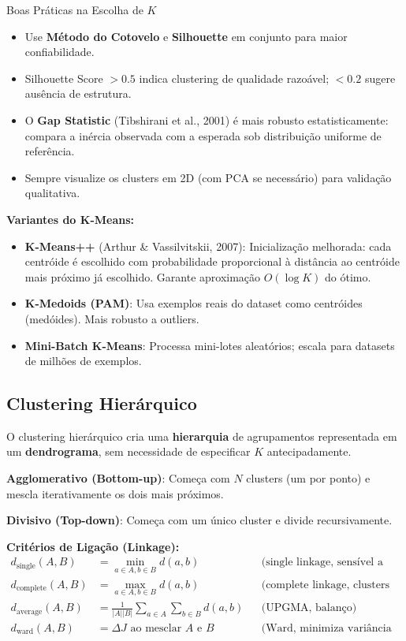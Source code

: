 \documentclass[12pt,a4paper]{article}
\begin{document}
\begin{dicabox}{Boas Práticas na Escolha de $K$}
\begin{itemize}
  \item Use \textbf{Método do Cotovelo} e \textbf{Silhouette} em conjunto para maior confiabilidade.
  \item Silhouette Score $> 0{.}5$ indica clustering de qualidade razoável; $< 0{.}2$ sugere ausência de estrutura.
  \item O \textbf{Gap Statistic} (Tibshirani et al., 2001) é mais robusto estatisticamente: compara a inércia observada com a esperada sob distribuição uniforme de referência.
  \item Sempre visualize os clusters em 2D (com PCA se necessário) para validação qualitativa.
\end{itemize}
\end{dicabox}

\textbf{Variantes do K-Means:}
\begin{itemize}
  \item \textbf{K-Means++} (Arthur \& Vassilvitskii, 2007): Inicialização melhorada: cada centróide é escolhido com probabilidade proporcional à distância ao centróide mais próximo já escolhido. Garante aproximação $O(\log K)$ do ótimo.
  \item \textbf{K-Medoids (PAM)}: Usa exemplos reais do dataset como centróides (medóides). Mais robusto a outliers.
  \item \textbf{Mini-Batch K-Means}: Processa mini-lotes aleatórios; escala para datasets de milhões de exemplos.
\end{itemize}


\subsection{Clustering Hierárquico}

O clustering hierárquico cria uma \textbf{hierarquia} de agrupamentos representada em um \textbf{dendrograma}, sem necessidade de especificar $K$ antecipadamente.

\textbf{Agglomerativo (Bottom-up)}: Começa com $N$ clusters (um por ponto) e mescla iterativamente os dois mais próximos.

\textbf{Divisivo (Top-down)}: Começa com um único cluster e divide recursivamente.

\textbf{Critérios de Ligação (Linkage):}
\begin{align}
  d_{\text{single}}(A,B) &= \min_{a \in A, b \in B} d(a,b) && \text{(single linkage, sensível a outliers)}\\
  d_{\text{complete}}(A,B) &= \max_{a \in A, b \in B} d(a,b) && \text{(complete linkage, clusters compactos)}\\
  d_{\text{average}}(A,B) &= \frac{1}{|A||B|} \sum_{a \in A} \sum_{b \in B} d(a,b) && \text{(UPGMA, balanço)}\\
  d_{\text{ward}}(A,B) &= \Delta J \text{ ao mesclar } A \text{ e } B && \text{(Ward, minimiza variância intra-cluster)}
\end{align}
\end{document}
